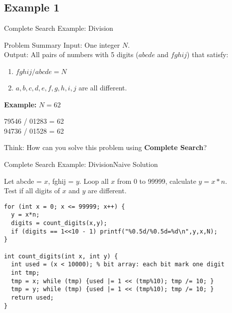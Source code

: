 \subsection{Example 1}
\begin{frame}{Complete Search Example: Division}

  \begin{block}{Problem Summary}
    Input: One integer $N$.\\
    Output: All pairs of numbers with 5 digits ($abcde$ and $fghij$) that satisfy:
    \begin{enumerate}
      \item $fghij / abcde = N$
      \item $a,b,c,d,e,f,g,h,i,j$ are all different.
    \end{enumerate}
  \end{block}\bigskip

  {\bf Example:} $N = 62$
  \medskip

  79546 / 01283 = 62\\
  94736 / 01528 = 62\\
  \bigskip

  \begin{block}{}
    Think: How can you solve this problem using {\bf Complete Search}?
  \end{block}
\end{frame}

\begin{frame}[fragile]{Complete Search Example: Division}{Naive Solution}
  \begin{block}{}
    Let abcde = $x$, fghij = $y$. Loop all $x$ from 0 to 99999, calculate $y = x*n$.\\
    Test if all digits of $x$ and $y$ are different.
  \end{block}

{\smaller
\begin{verbatim}
for (int x = 0; x <= 99999; x++) {
  y = x*n;
  digits = count_digits(x,y);
  if (digits == 1<<10 - 1) printf("%0.5d/%0.5d=%d\n",y,x,N);
}

int count_digits(int x, int y) {
  int used = (x < 10000); % bit array: each bit mark one digit
  int tmp;
  tmp = x; while (tmp) {used |= 1 << (tmp%10); tmp /= 10; }
  tmp = y; while (tmp) {used |= 1 << (tmp%10); tmp /= 10; }
  return used;
}
\end{verbatim}
  }
\end{frame}

